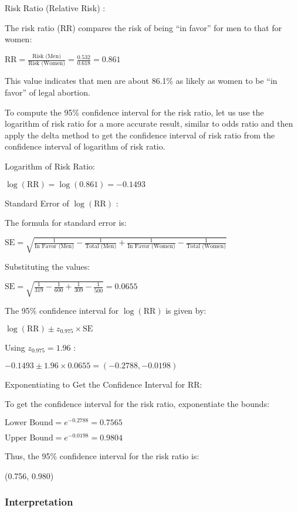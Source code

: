 \documentclass[
]{article}
\begin{document}
Risk Ratio (Relative Risk) :

The risk ratio (RR) compares the risk of being ``in favor'' for men to
that for women:

\({\text{RR} = \frac{\text{Risk (Men)}}{\text{Risk (Women)}} = \frac{0.532}{0.618} = 0.861}\)

This value indicates that men are about 86.1\% as likely as women to be
``in favor'' of legal abortion.

To compute the 95\% confidence interval for the risk ratio, let us use
the logarithm of risk ratio for a more accurate result, similar to odds
ratio and then apply the delta method to get the confidence interval of
risk ratio from the confidence interval of logarithm of risk ratio.

Logarithm of Risk Ratio:

\({\log(\text{RR}) = \log(0.861) = -0.1493}\)

Standard Error of \({\log(\text{RR})}\) :

The formula for standard error is:

\({\text{SE} = \sqrt{\frac{1}{\text{In Favor (Men)}} - \frac{1}{\text{Total (Men)}} + \frac{1}{\text{In Favor (Women)}} - \frac{1}{\text{Total (Women)}}}}\)

Substituting the values:

\({\text{SE} = \sqrt{\frac{1}{319} - \frac{1}{600} + \frac{1}{309} - \frac{1}{500}} = 0.0655}\)

The 95\% confidence interval for \({\log(\text{RR})}\) is given by:

\({\log(\text{RR}) \pm z_{0.975} \times \text{SE}}\)

Using \({z_{0.975} = 1.96}\) :

\({-0.1493 \pm 1.96 \times 0.0655 = (-0.2788, -0.0198)}\)

Exponentiating to Get the Confidence Interval for RR:

To get the confidence interval for the risk ratio, exponentiate the
bounds:

\({\text{Lower Bound} = e^{-0.2788} = 0.7565}\)

\({\text{Upper Bound} = e^{-0.0198} = 0.9804}\)

Thus, the 95\% confidence interval for the risk ratio is:

(0.756, 0.980)

\subsubsection{Interpretation}\label{interpretation-1}
\end{document}
